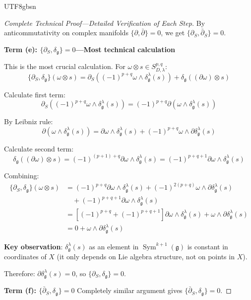 \documentclass[a4paper,12pt]{extarticle}
\theoremstyle{definition}
\begin{document}
\begin{CJK}{UTF8}{gbsn}
\begin{proof}[Complete Technical Proof—Detailed Verification of Each Step]
By anticommutativity on complex manifolds $\{\partial, \bar{\partial}\} = 0$, we get $\{\partial_S, \bar{\partial}_S\} = 0$.

\textbf{Term (e): $\{\partial_S, \delta_{\mathfrak{g}}\} = 0$—Most technical calculation}

This is the most crucial calculation. For $\omega \otimes s \in S^{p,q}_{D,\lambda}$:
$$\{\partial_S, \delta_{\mathfrak{g}}\}(\omega \otimes s) = \partial_S((-1)^{p+q} \omega \wedge \delta^\lambda_\mathfrak{g}(s)) + \delta_{\mathfrak{g}}((\partial\omega) \otimes s)$$

Calculate first term:
$$\partial_S((-1)^{p+q} \omega \wedge \delta^\lambda_\mathfrak{g}(s)) = (-1)^{p+q} \partial(\omega \wedge \delta^\lambda_\mathfrak{g}(s))$$

By Leibniz rule:
$$\partial(\omega \wedge \delta^\lambda_\mathfrak{g}(s)) = \partial\omega \wedge \delta^\lambda_\mathfrak{g}(s) + (-1)^{p+q} \omega \wedge \partial\delta^\lambda_\mathfrak{g}(s)$$

Calculate second term:
$$\delta_{\mathfrak{g}}((\partial\omega) \otimes s) = (-1)^{(p+1)+q} \partial\omega \wedge \delta^\lambda_\mathfrak{g}(s) = (-1)^{p+q+1} \partial\omega \wedge \delta^\lambda_\mathfrak{g}(s)$$

Combining:
\begin{align}
\{\partial_S, \delta_{\mathfrak{g}}\}(\omega \otimes s) &= (-1)^{p+q} \partial\omega \wedge \delta^\lambda_\mathfrak{g}(s) + (-1)^{2(p+q)} \omega \wedge \partial\delta^\lambda_\mathfrak{g}(s) \\
&\quad + (-1)^{p+q+1} \partial\omega \wedge \delta^\lambda_\mathfrak{g}(s) \\
&= [(-1)^{p+q} + (-1)^{p+q+1}] \partial\omega \wedge \delta^\lambda_\mathfrak{g}(s) + \omega \wedge \partial\delta^\lambda_\mathfrak{g}(s) \\
&= 0 + \omega \wedge \partial\delta^\lambda_\mathfrak{g}(s)
\end{align}

\textbf{Key observation}: $\delta^\lambda_\mathfrak{g}(s)$ as an element in $\operatorname{Sym}^{k+1}(\mathfrak{g})$ is constant in coordinates of $X$ (it only depends on Lie algebra structure, not on points in $X$).

Therefore: $\partial\delta^\lambda_\mathfrak{g}(s) = 0$, so $\{\partial_S, \delta_{\mathfrak{g}}\} = 0$.

\textbf{Term (f): $\{\bar{\partial}_S, \delta_{\mathfrak{g}}\} = 0$}
Completely similar argument gives $\{\bar{\partial}_S, \delta_{\mathfrak{g}}\} = 0$.


\end{proof}
\end{CJK}
\end{document}
